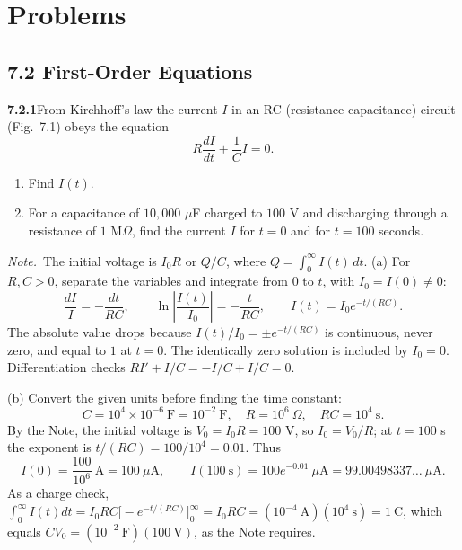 
\section*{Problems}

\subsection*{7.2 First-Order Equations}

\par\bigskip
\noindent\textbf{7.2.1}\quad From Kirchhoff's law the current $I$ in an RC
(resistance-capacitance) circuit (Fig.~7.1) obeys the equation
\[
R\frac{dI}{dt}+\frac{1}{C}I=0.
\]
\begin{enumerate}
\item[(a)] Find $I(t)$.
\item[(b)] For a capacitance of $10{,}000$ $\mu$F charged to $100$ V and
  discharging through a resistance of $1$ M$\Omega$, find the current $I$ for
  $t=0$ and for $t=100$ seconds.
\end{enumerate}
\emph{Note.}~The initial voltage is $I_{0}R$ or $Q/C$, where
$Q=\int_{0}^{\infty}I(t)\,dt$.
\solution
(a) For $R,C>0$, separate the variables and integrate from $0$ to $t$,
with $I_0=I(0)\ne0$:
\[
\frac{dI}{I}=-\frac{dt}{RC},\qquad
\ln\left|\frac{I(t)}{I_0}\right|=-\frac{t}{RC},\qquad
\boxed{I(t)=I_0e^{-t/(RC)}}.
\]
The absolute value drops because $I(t)/I_0=\pm e^{-t/(RC)}$ is continuous,
never zero, and equal to $1$ at $t=0$.
The identically zero solution is included by $I_0=0$. Differentiation
checks $RI'+I/C=-I/C+I/C=0$.

(b) Convert the given units before finding the time constant:
\[
C=10^4\times10^{-6}\ \mathrm F=10^{-2}\ \mathrm F,\quad
R=10^6\ \Omega,\quad RC=10^4\ \mathrm s.
\]
By the Note, the initial voltage is $V_0=I_0R=100$ V, so $I_0=V_0/R$;
at $t=100$ s the exponent is $t/(RC)=100/10^4=0.01$. Thus
\[
\boxed{I(0)=\frac{100}{10^6}\ \mathrm A=100\ \mu\mathrm A},\qquad
\boxed{I(100\ \mathrm s)=100e^{-0.01}\ \mu\mathrm A
=99.00498337\ldots\ \mu\mathrm A}.
\]
As a charge check,
$\int_0^\infty I(t)dt=I_0RC\bigl[-e^{-t/(RC)}\bigr]_0^\infty=I_0RC
=(10^{-4}\ \mathrm A)(10^4\ \mathrm s)=1\ \mathrm C$, which equals
$CV_0=(10^{-2}\ \mathrm F)(100\ \mathrm V)$, as the Note requires.

